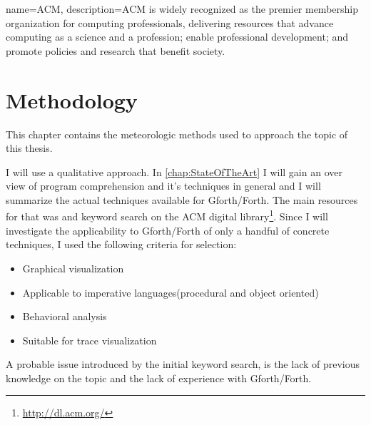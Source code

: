 {
  name={ACM},
  description={ACM is widely recognized as the premier membership organization for computing professionals, delivering resources that advance computing as a science and a profession; enable professional development; and promote policies and research that benefit society.}
}


\chapter{Methodology}
\label{chap:Methodology}

This chapter contains the meteorologic methods used to approach the topic of this thesis.

I will use a qualitative approach. In \autoref{chap:StateOfTheArt} I will gain an over view of program comprehension and it's techniques in general and I will summarize the actual techniques available for Gforth/Forth. The main resources for that was \cite{Cornelissen:2009:SSP:1638616.1639301} and keyword search on the \gls{ACM} digital library\footnote{\url{http://dl.acm.org/}}.
Since I will investigate the applicability to Gforth/Forth of only a handful of concrete techniques, I used the following criteria for selection:
\begin{itemize}
\item Graphical visualization 
\item Applicable to imperative languages(procedural and object oriented)
\item Behavioral analysis
\item Suitable for trace visualization
\end{itemize}
A probable issue introduced by the initial keyword search, is the lack of previous knowledge on the topic and the lack of experience with Gforth/Forth.

